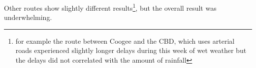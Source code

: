 \documentclass{article}
\begin{document}
Other routes show slightly different results\footnote{for example the route between Coogee and the CBD, which uses
arterial roads experienced slightly longer delays during this week of wet weather but the delays did not correlated
with the amount of rainfall}, but the overall result was underwhelming.
\end{document}
